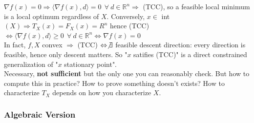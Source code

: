 \documentclass[10pt]{report}
\begin{document}
$\nabla f(x) = 0\Rightarrow \langle\nabla f(x),d\rangle = 0\:\:\forall\:d\in \mathbb{R}^n \Rightarrow$ (TCC), so a feasible local minimum is a local optimum regardless of $X$. Conversely, $x\in$ int$(X)\Rightarrow T_X(x) = F_X(x) = R^n$ hence (TCC) $\Leftrightarrow\langle\nabla f(x),d\rangle \geq 0\:\:\forall\:d\in \mathbb{R}^n\Leftrightarrow \nabla f(x) = 0$\\
In fact, $f,X$ convex $\Rightarrow$ (TCC) $\Leftrightarrow \not\exists$ feasible descent direction: every direction is feasible, hence only descent matters. So "$x$ satifies (TCC)" is a direct constrained generalization of "$x$ stationary point".\\
Necessary, \textbf{not sufficient} but the only one you can reasonably check. But how to compute this in practice? How to prove something doesn't exists? How to characterize $T_X$ depends on how you characterize $X$.
\subsubsection{Algebraic Version}
\end{document}
